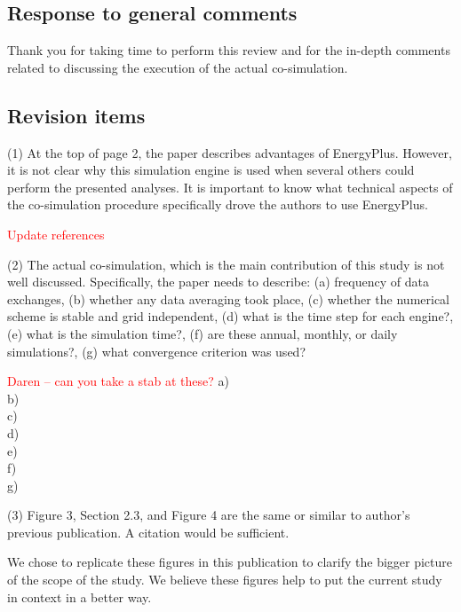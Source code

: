 \documentclass[answers,12pt]{exam}
\begin{document}
\begin{questions}
\subsection{Response to general comments}
\begin{solution}
Thank you for taking time to perform this review and for the in-depth comments related to discussing the execution of the actual co-simulation.
\end{solution}

\subsection{Revision items}

\question 
(1) At the top of page 2, the paper describes advantages of EnergyPlus. However, it is not clear why this simulation engine is used when several others could perform the presented analyses. It is important to know what technical aspects of the co-simulation procedure specifically drove the authors to use EnergyPlus. 
\begin{solution}
\textcolor{red}{Update references}

\end{solution}

\question 
(2) The actual co-simulation, which is the main contribution of this study is not well discussed. Specifically, the paper needs to describe: (a) frequency of data exchanges, (b) whether any data averaging took place, (c) whether the numerical scheme is stable and grid independent, (d) what is the time step for each engine?, (e) what is the simulation time?, (f) are these annual, monthly, or daily simulations?, (g) what convergence criterion was used? 
\begin{solution}
\textcolor{red}{Daren -- can you take a stab at these?}
a) \\
b) \\
c) \\
d) \\
e) \\
f) \\
g) \\
\end{solution}

\question 
(3) Figure 3, Section 2.3, and Figure 4 are the same or similar to author’s previous publication. A citation would be sufficient. 
\begin{solution}
We chose to replicate these figures in this publication to clarify the bigger picture of the scope of the study. We believe these figures help to put the current study in context in a better way.
\end{solution}


\end{questions}
\end{document}
